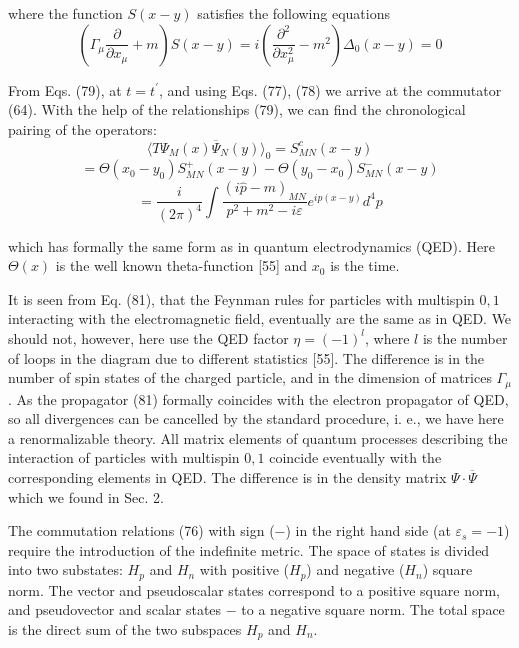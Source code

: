 \documentclass[a4paper,12pt]{article}
\begin{document}
where the function $S(x-y)$ satisfies the following equations
\begin{equation}
\left( \Gamma _\mu \frac \partial {\partial x_\mu }+m\right) S(x-y)=i\left(
\frac{\partial ^2}{\partial x_\mu ^2}-m^2\right) \Delta _0(x-y)=0  \label{80}
\end{equation}

From Eqs. (79), at $t=t^{\prime }$, and using Eqs. (77), (78) we arrive at
the commutator (64). With the help of the relationships (79), we can find
the chronological pairing of the operators:
\[
\langle T\Psi _M(x)\overline{\Psi }_N(y)\rangle _0=S_{MN}^c(x-y)
\]
\[
=\Theta (x_0-y_0)S_{MN}^{+}(x-y)-\Theta (y_0-x_0)S_{MN}^{-}(x-y)
\]
\begin{equation}
=\frac i{(2\pi )^4}\int \frac{\left( i\widehat{p}-m\right) _{MN}}{
p^2+m^2-i\varepsilon }e^{ip(x-y)}d^4p  \label{81}
\end{equation}

which has formally the same form as in quantum electrodynamics
(QED). Here $ \Theta (x)$ is the well known theta-function [55]
and $x_0$ is the time.

It is seen from Eq. (81), that the Feynman rules for particles with
multispin $0,1$ interacting with the electromagnetic field, eventually are
the same as in QED. We should not, however, here use the QED factor $\eta
=(-1)^l$, where $l$ is the number of loops in the diagram due to different
statistics [55]. The difference is in the number of spin states of the
charged particle, and in the dimension of matrices $\Gamma _\mu $. As the
propagator (81) formally coincides with the electron propagator of QED, so
all divergences can be cancelled by the standard procedure, i. e., we have
here a renormalizable theory. All matrix elements of quantum processes
describing the interaction of particles with multispin $0,1$ coincide
eventually with the corresponding elements in QED. The difference is in the
density matrix $\Psi \cdot \overline{\Psi }$ which we found in Sec. 2.

The commutation relations (76) with sign ($-$) in the right hand
side (at $ \varepsilon _s=-1$) require the introduction of the
indefinite metric. The space of states is divided into two
substates: $H_p$ and $H_n$ with positive ($H_p$) and negative
($H_n$) square norm. The vector and pseudoscalar states correspond
to a positive square norm, and pseudovector and scalar states $-$
to a negative square norm. The total space is the direct sum of
the two subspaces $H_p$ and $H_n$.
\end{document}
